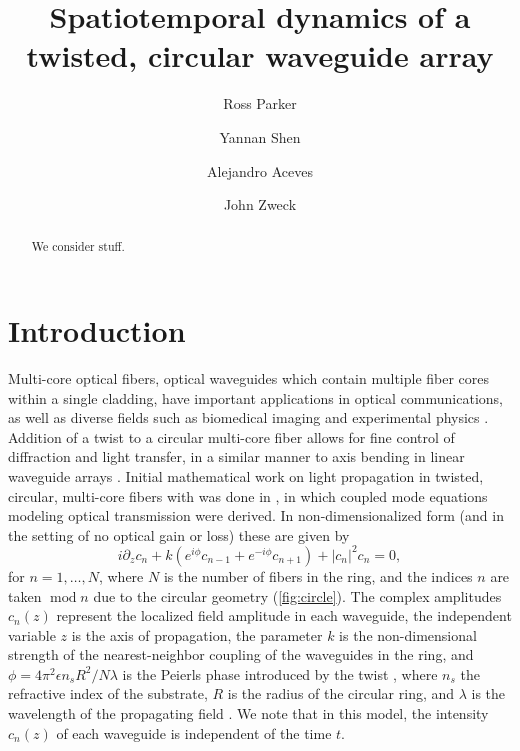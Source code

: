 \documentclass[11pt,reqno]{amsart}
\DeclareMathOperator{\md}{mod}
\begin{document}
\title{Spatiotemporal dynamics of a twisted, circular waveguide array}

\author{Ross Parker}
\address{Department of Mathematics, Southern Methodist University, 
Dallas, TX 75275, USA}

\author{Yannan Shen} 
\address{Department of Mathematics, University of Kansas, Lawrence, KS 66045, USA}

\author{Alejandro Aceves}
\address{Department of Mathematics, Southern Methodist University, 
Dallas, TX 75275, USA}

\author{John Zweck}
\address{Department of Mathematics, The University of Texas at Dallas, 
Richardson, TX 75080, USA}

\begin{abstract}
    We consider stuff.
\end{abstract}

\maketitle

\section{Introduction}

Multi-core optical fibers, optical waveguides which contain multiple fiber  cores within a single cladding, have important applications in optical communications, as well as diverse fields such as biomedical imaging and experimental physics \cite{Ortiz2018}. Addition of a twist to a circular multi-core fiber allows for fine control of diffraction and light transfer, in a similar manner to axis bending in linear waveguide arrays \cite{Longhi2005}. Initial mathematical work on light propagation in twisted, circular, multi-core fibers with was done in \cite{Longhi2007,Longhi2007b,Garanovich2012}, in which coupled mode equations modeling optical transmission were derived. In non-dimensionalized form (and in the setting of no optical gain or loss) these are given by
\begin{equation}\label{eq:coupledmode}
i \partial_z c_n + k \left(e^{i\phi}c_{n-1} + e^{-i\phi}c_{n+1} \right) + |c_n|^2 c_n = 0,
\end{equation}
for $n = 1, \dots, N$, where $N$ is the number of fibers in the ring, and the indices $n$ are taken $\md n$ due to the circular geometry (\cref{fig:circle}). The complex amplitudes $c_n(z)$ represent the localized field amplitude in each waveguide, the independent variable $z$ is the axis of propagation, the parameter $k$ is the non-dimensional strength of the nearest-neighbor coupling of the waveguides in the ring, and $\phi = 4 \pi^2 \epsilon n_s R^2/N \lambda$ is the Peierls phase introduced by the twist \cite{Longhi2007,Peierls1933}, where $n_s$ the refractive index of the substrate, $R$ is the radius of the circular ring, and $\lambda$ is the wavelength of the propagating field \cite{castro2016}. We note that in this model, the intensity $c_n(z)$ of each waveguide is independent of the time $t$.
\end{document}
